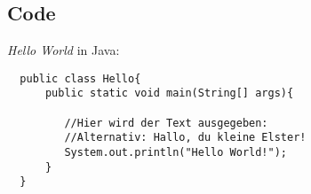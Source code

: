 \subsection{Code}
\textit{Hello World} in Java:\\
\begin{lstlisting}
  public class Hello{
      public static void main(String[] args){
      
         //Hier wird der Text ausgegeben:
         //Alternativ: Hallo, du kleine Elster!
         System.out.println("Hello World!");
      }
  }
\end{lstlisting}